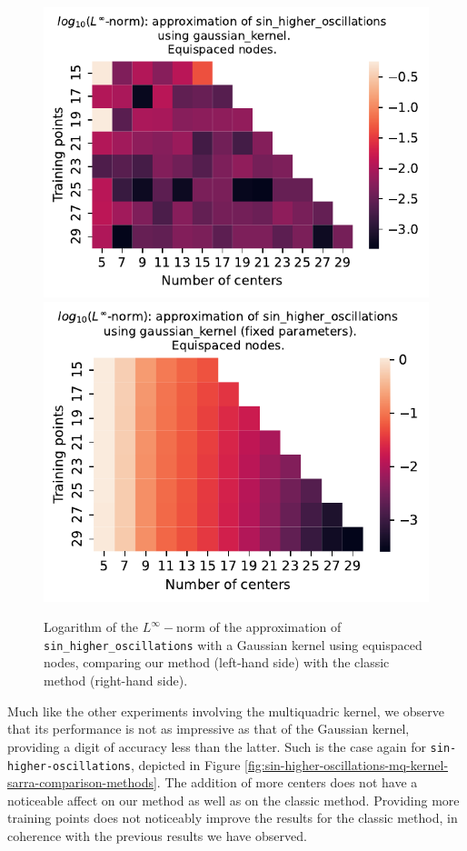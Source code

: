 \documentclass[12pt]{report} %
\begin{document}
\begin{figure}[ht]
    \centering
    \includegraphics[width=.49\textwidth]{imagenes/experiments/1d/variational/sin_higher_oscillations-Kgaussian_kernel-Equi.pdf}
    \includegraphics[width=.49\textwidth]{imagenes/experiments/1d/least_squares/opt-sin_higher_oscillations-Kgaussian_kernel-Equi.pdf}
    \caption{Logarithm of the $L^\infty-$norm of the approximation of \texttt{sin\_higher\_oscillations} with a Gaussian kernel using equispaced nodes, comparing our method (left-hand side) with the classic method (right-hand side).}
    \label{fig:sin-higher-oscillations-gaussian-kernel-comparison-methods}
\end{figure}

Much like the other experiments involving the multiquadric kernel, we observe that its performance is not as impressive as that of the Gaussian kernel, providing a digit of accuracy less than the latter. Such is the case again for \texttt{sin-higher-oscillations}, depicted in Figure \ref{fig:sin-higher-oscillations-mq-kernel-sarra-comparison-methods}. The addition of more centers does not have a noticeable affect on our method as well as on the classic method. %
Providing more training points does not noticeably improve the results for the classic method, in coherence with the previous results we have observed.
\end{document}
